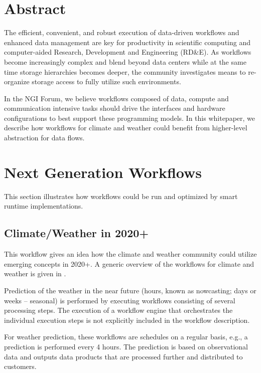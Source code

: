 \documentclass[a4paper, twocolumn]{article}
\title{\papertitle}
\author{Julian M. Kunkel
  \textit{University of Reading}
	\and
  Chris Hoffman
  \textit{National Center for Atmospheric Research}
}
\date{Version: \pversion; \today}
\begin{document}
\maketitle
\thispagestyle{fancy}

\section*{Abstract}
The efficient, convenient, and robust execution of data-driven workflows and enhanced data management are key for productivity in scientific computing and computer-aided Research, Development and Engineering (RD\&E).
As workflows become increasingly complex and blend beyond data centers while at the same time storage hierarchies becomes deeper, the community investigates means to re-organize storage access to fully utilize such environments.

In the NGI Forum, we believe workflows composed of data, compute and communication intensive tasks should drive the interfaces and hardware configurations to best support these programming models.
In this whitepaper, we describe how workflows for climate and weather could benefit from higher-level abstraction for data flows.

\section{Next Generation Workflows}
\label{sec:ngWorkflows}

This section illustrates how workflows could be run and optimized by smart runtime implementations.


\subsection{Climate/Weather in 2020+}

This workflow gives an idea how the climate and weather community could utilize emerging concepts in 2020+.
A generic overview of the workflows for climate and weather is given in .

Prediction of the weather in the near future (hours, known as nowcasting; days or weeks -- seasonal) is performed by executing workflows consisting of several processing steps. The execution of a workflow engine that orchestrates the individual execution steps is not explicitly included in the workflow description.

For weather prediction, these workflows are schedules on a regular basis, e.g., a prediction is performed every 4 hours. The prediction is based on observational data and outputs data products that are processed further and distributed to customers.
\end{document}
